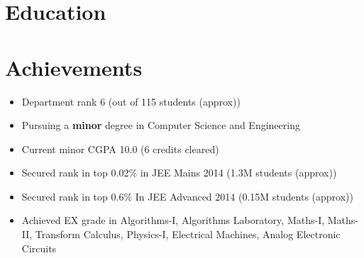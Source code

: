 \documentclass[10pt,a4paper,sans]{moderncv}        %
\begin{document}
\makecvtitle

\section{Education}




\section{Achievements}

 
\begin{itemize}%
\item Department rank 6 (out of 115 students (approx))
\item Pursuing a \textbf{minor} degree in Computer Science and Engineering
\item Current minor CGPA 10.0 (6 credits cleared)
\item Secured rank in top 0.02\% in JEE Mains 2014 (1.3M students (approx))
\item Secured rank in top 0.6\% In JEE Advanced 2014 (0.15M students (approx))
\item Achieved EX grade in Algorithms-I, Algorithms Laboratory, Maths-I, Maths-II, Transform Calculus, Physics-I, Electrical Machines, Analog Electronic Circuits
\end{itemize}


\end{document}
